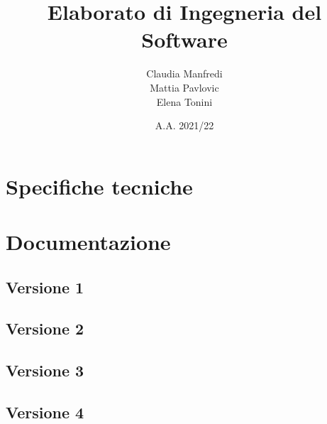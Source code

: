 \documentclass{report}
\title{Elaborato di Ingegneria del Software}
\author{Claudia Manfredi\\Mattia Pavlovic\\Elena Tonini}
\date{A.A. 2021/22}
\begin{document}
\maketitle
\tableofcontents

\chapter{Specifiche tecniche}


\chapter{Documentazione}

\section{Versione 1}





\cleardoublepage
\section{Versione 2}





\cleardoublepage
\section{Versione 3}





\cleardoublepage
\section{Versione 4}




\end{document}
